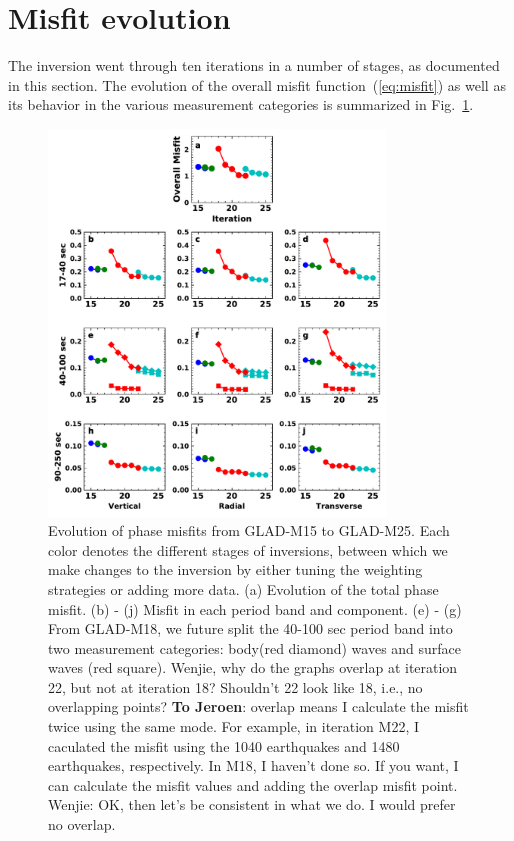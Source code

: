 \documentclass[extra,mreferee]{gji}
\begin{document}
\section{Misfit evolution}

The inversion went through ten iterations in a number of stages, as documented in this section.
The evolution of the overall misfit function~(\ref{eq:misfit}) as well as its behavior in the various measurement categories is summarized in Fig.~\ref{fig:misfit}.

\begin{figure}
  \centering
  \includegraphics[width=0.8\textwidth]{figures/misfit.pdf}
  \caption{Evolution of phase misfits from GLAD-M15 to GLAD-M25.
  Each color denotes the different stages of inversions, between
  which we make changes to the inversion by either tuning the
  weighting strategies or adding more data.
  (a) Evolution of the total phase misfit. (b) - (j) Misfit in
  each period band and component. (e) - (g) From GLAD-M18,
  we future split the 40-100 sec period band into two
  measurement categories: body(red diamond) waves and surface waves
  (red square).
  {\color{red} Wenjie, why do the graphs overlap at iteration 22, but not at iteration 18? Shouldn't 22 look like 18, i.e., no overlapping points?    \textbf{To Jeroen}: overlap means I calculate the misfit twice using the same mode. For example, in iteration M22, I caculated the misfit using the 1040 earthquakes and 1480 earthquakes, respectively. In M18, I haven't done so. If you want, I can calculate the misfit values and adding the overlap misfit point.}
  {\color{blue}Wenjie: OK, then let's be consistent in what we do. I would prefer no overlap.}
  }
  \label{fig:misfit}
\end{figure}
\end{document}

